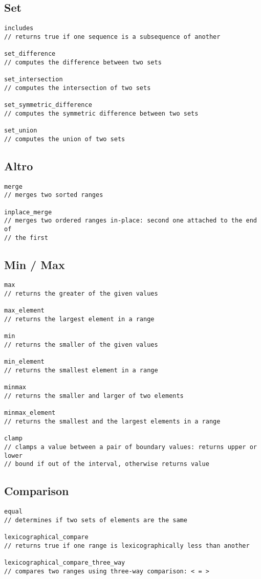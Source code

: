 \documentclass[10pt, oneside]{Book}
\begin{document}
\subsection{Set}
\begin{verbatim}
includes
// returns true if one sequence is a subsequence of another

set_difference
// computes the difference between two sets

set_intersection
// computes the intersection of two sets

set_symmetric_difference
// computes the symmetric difference between two sets

set_union
// computes the union of two sets
\end{verbatim}
\subsection{Altro}
\begin{verbatim}
merge
// merges two sorted ranges

inplace_merge
// merges two ordered ranges in-place: second one attached to the end of
// the first
\end{verbatim}
\subsection{Min / Max}
\begin{verbatim}
max
// returns the greater of the given values

max_element
// returns the largest element in a range

min
// returns the smaller of the given values

min_element
// returns the smallest element in a range

minmax
// returns the smaller and larger of two elements

minmax_element
// returns the smallest and the largest elements in a range

clamp
// clamps a value between a pair of boundary values: returns upper or lower
// bound if out of the interval, otherwise returns value
\end{verbatim}
\subsection{Comparison}
\begin{verbatim}
equal
// determines if two sets of elements are the same

lexicographical_compare
// returns true if one range is lexicographically less than another

lexicographical_compare_three_way 
// compares two ranges using three-way comparison: < = >
\end{verbatim}
\end{document}

